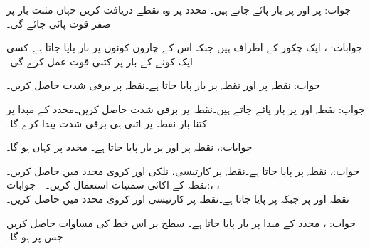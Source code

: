  جواب:
 پر  اور  پر  بار پائے جاتے ہیں۔ محدد پر وہ نقطے دریافت کریں جہاں مثبت بار پر صفر قوت پائی جائے گی۔

جوابات: ، 
ایک چکور کے اطراف  ہیں جبکہ اس کے چاروں کونوں پر  بار پایا جاتا ہے۔کسی ایک کونے کے بار پر کتنی قوت عمل کرے گی۔

جواب:
نقطہ  پر  اور نقطہ  پر  بار پایا جاتا ہے۔نقطہ  پر برقی شدت  حاصل کریں۔

جواب:
نقطہ  اور  پر  بار پائے جاتے ہیں۔نقطہ  پر برقی شدت  حاصل کریں۔محدد کے مبدا پر کتنا بار نقطہ  پر اتنی ہی برقی شدت پیدا کرے گا۔

جوابات:، 
نقطہ  پر  اور  پر  بار پایا جاتا ہے۔ محدد پر کہاں  ہو گا۔

جواب:، 
نقطہ  پر  پایا جاتا ہے۔نقطہ  پر کارتیسی، نلکی اور کروی  محدد میں  حاصل کریں۔نقطہ  کے اکائی سمتیات استعمال کریں۔
-
جوابات:، ، \\
نقطہ  اور  پر  جبکہ  پر  پایا جاتا ہے۔نقطہ  پر کارتیسی اور کروی محدد میں  حاصل کریں۔

جواب: ، 
محدد کے مبدا پر  بار پایا جاتا ہے۔ سطح  پر اس خط کی مساوات حاصل کریں جس پر  ہو گا۔

